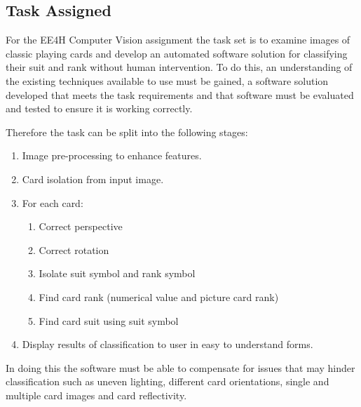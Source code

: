 	\subsection{Task Assigned}
		\label{sec:task}
		For the EE4H Computer Vision assignment the task set is to examine images of classic playing cards and develop an automated software solution for classifying their suit and rank without human intervention. To do this, an understanding of the existing techniques available to use must be gained, a software solution developed that meets the task requirements and that software must be evaluated and tested to ensure it is working correctly. 

		Therefore the task can be split into the following stages:

		\begin{enumerate}
			\item Image pre-processing to enhance features.
			\item Card isolation from input image.
			\item For each card:
			\begin{enumerate}
				\item Correct perspective
				\item Correct rotation
				\item Isolate suit symbol and rank symbol
				\item Find card rank (numerical value and picture card rank)
				\item Find card suit using suit symbol
			\end{enumerate}
			\item Display results of classification to user in easy to understand forms.
		\end{enumerate}

		In doing this the software must be able to compensate for issues that may hinder classification such as uneven lighting, different card orientations, single and multiple card images and card reflectivity.
